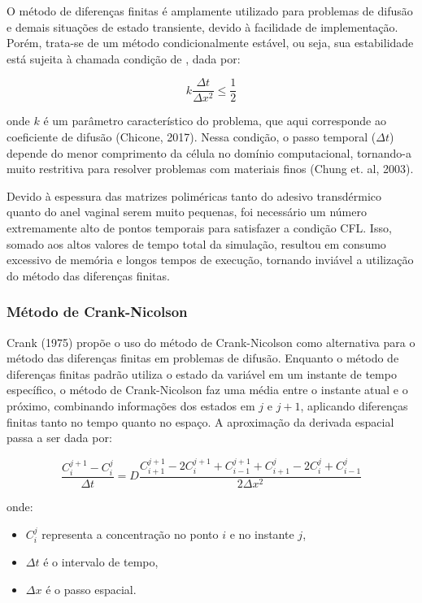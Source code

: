 O método de diferenças finitas é amplamente utilizado para problemas de difusão e demais situações de estado transiente, devido à facilidade de implementação. Porém, trata-se de um método condicionalmente estável, ou seja, sua estabilidade está sujeita à chamada condição de , dada por:

\begin{equation}
    k \frac{\Delta t}{\Delta x^2} \leq \frac{1}{2}
\end{equation}

\noindent onde $k$ é um parâmetro característico do problema, que aqui corresponde ao coeficiente de difusão (Chicone, 2017). Nessa condição, o passo temporal ($\Delta t$) depende do menor comprimento da célula no domínio computacional, tornando-a muito restritiva para resolver problemas com materiais finos (Chung et. al, 2003). 

Devido à espessura das matrizes poliméricas tanto do adesivo transdérmico quanto do anel vaginal serem muito pequenas, foi necessário um número extremamente alto de pontos temporais para satisfazer a condição CFL. Isso, somado aos altos valores de tempo total da simulação, resultou em consumo excessivo de memória e longos tempos de execução, tornando inviável a utilização do método das diferenças finitas.

\subsubsection{Método de Crank-Nicolson}

Crank (1975) propõe o uso do método de Crank-Nicolson como alternativa para o método das diferenças finitas em problemas de difusão. Enquanto o método de diferenças finitas padrão utiliza o estado da variável em um instante de tempo específico, o método de Crank-Nicolson faz uma média entre o instante atual e o próximo, combinando informações dos estados em $j$ e $j+1$, aplicando diferenças finitas tanto no tempo quanto no espaço. A aproximação da derivada espacial passa a ser dada por:

\begin{equation}
\frac{C_i^{j+1} - C_i^j}{\Delta t} = D \frac{C_{i+1}^{j+1} - 2C_i^{j+1} + C_{i-1}^{j+1} + C_{i+1}^j - 2C_i^j + C_{i-1}^j}{2 \Delta x^2}
\end{equation}

\noindent onde:
\begin{itemize}
    \item \( C_i^j \) representa a concentração no ponto \( i \) e no instante \( j \),
    \item \( \Delta t \) é o intervalo de tempo,
    \item \( \Delta x \) é o passo espacial.
\end{itemize}

